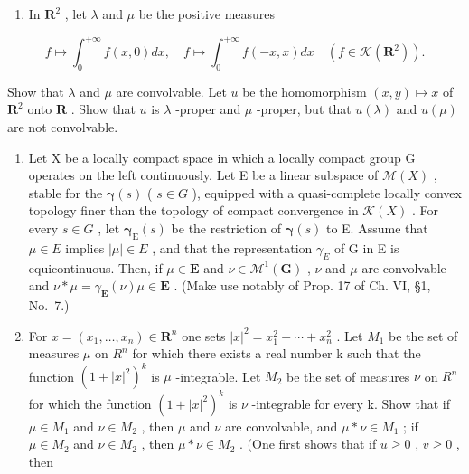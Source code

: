 \exercisesection{}

\begin{enumerate}
\def\labelenumi{\arabic{enumi})}
\tightlist
\item
  In \(\mathbf{R}^2\) , let \(\lambda\) and \(\mu\) be the positive measures
\end{enumerate}

\[
f \mapsto \int_ {0} ^ {+ \infty} f (x, 0) d x, \quad f \mapsto \int_ {0} ^ {+ \infty} f (- x, x) d x \quad \left(f \in \mathcal {K} (\mathbf {R} ^ {2})\right).
\]

Show that \(\lambda\) and \(\mu\) are convolvable. Let \(u\) be the homomorphism \((x,y) \mapsto x\) of \(\mathbf{R}^2\) onto \(\mathbf{R}\) . Show that \(u\) is \(\lambda\) -proper and \(\mu\) -proper, but that \(u(\lambda)\) and \(u(\mu)\) are not convolvable.

\begin{enumerate}
\def\labelenumi{\arabic{enumi})}
\setcounter{enumi}{1}
\item
  Let X be a locally compact space in which a locally compact group G operates on the left continuously. Let E be a linear subspace of \(\mathcal{M}(X)\) , stable for the \(\boldsymbol{\gamma}(s)\) ( \(s \in G\) ), equipped with a quasi-complete locally convex topology finer than the topology of compact convergence in \(\mathcal{K}(X)\) . For every \(s \in G\) , let \(\boldsymbol{\gamma}_{\mathrm{E}}(s)\) be the restriction of \(\boldsymbol{\gamma}(s)\) to E. Assume that \(\mu \in E\) implies \(|\mu| \in E\) , and that the representation \(\gamma_{E}\) of G in E is equicontinuous. Then, if \(\mu \in \mathbf{E}\) and \(\nu \in \mathcal{M}^1 (\mathbf{G})\) , \(\nu\) and \(\mu\) are convolvable and \(\nu * \mu = \gamma_{\mathbf{E}}(\nu)\mu \in \mathbf{E}\) . (Make use notably of Prop. 17 of Ch. VI, §1, No.~7.)
\item
  For \(x = (x_{1}, \ldots, x_{n}) \in \mathbf{R}^{n}\) one sets \(|x|^{2} = x_{1}^{2} + \cdots + x_{n}^{2}\) . Let \(M_{1}\) be the set of measures \(\mu\) on \(R^{n}\) for which there exists a real number k such that the function \((1 + |x|^{2})^{k}\) is \(\mu\) -integrable. Let \(M_{2}\) be the set of measures \(\nu\) on \(R^{n}\) for which the function \((1 + |x|^{2})^{k}\) is \(\nu\) -integrable for every k. Show that if \(\mu \in M_{1}\) and \(\nu \in M_{2}\) , then \(\mu\) and \(\nu\) are convolvable, and \(\mu * \nu \in M_{1}\) ; if \(\mu \in M_{2}\) and \(\nu \in M_{2}\) , then \(\mu * \nu \in M_{2}\) . (One first shows that if \(u \geqslant 0\) , \(v \geqslant 0\) , then
\end{enumerate}

